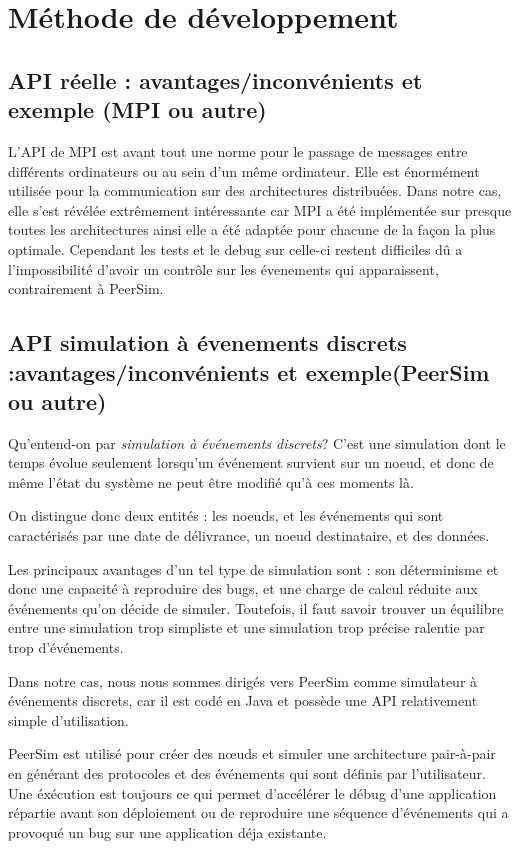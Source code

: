 \documentclass{article}
\begin{document}
		\section{Méthode de développement}
			\subsection{API réelle : avantages/inconvénients et exemple (MPI ou autre)}
			L'API de MPI est avant tout une norme pour le passage de messages entre différents ordinateurs ou au sein d'un même ordinateur.
			Elle est énormément utilisée pour la communication sur des architectures distribuées.
			Dans notre cas, elle s'est révélée extrêmement intéressante car MPI a été implémentée sur presque toutes les architectures ainsi elle 
			a été adaptée pour chacune de la façon la plus optimale. Cependant les tests et le debug sur celle-ci restent difficiles dû a l'impossibilité 
			d'avoir un contrôle sur les évenements qui apparaissent, contrairement à PeerSim.
			
			\subsection{API simulation à évenements discrets :avantages/inconvénients et exemple(PeerSim ou autre)}
				Qu'entend-on par \textit{simulation à événements discrets}? C'est une simulation dont le temps évolue seulement lorsqu'un événement survient sur un noeud, et donc de même l'état du système ne peut être modifié qu'à ces moments là.

				On distingue donc deux entités : les noeuds, et les événements qui sont caractérisés par une date de délivrance, un noeud destinataire, et des données.

				Les principaux avantages d'un tel type de simulation sont : son déterminisme et donc une capacité à reproduire des bugs, et une charge de calcul réduite aux événements qu'on décide de simuler. Toutefois, il faut savoir trouver un équilibre entre une simulation trop simpliste et une simulation trop précise ralentie par trop d'événements.

				Dans notre cas, nous nous sommes dirigés vers PeerSim comme simulateur à événements discrets, car il est codé en Java et possède une API relativement simple d'utilisation.

				PeerSim est utilisé pour créer des nœuds et simuler une architecture pair-à-pair en générant des protocoles et des événements qui sont définis par l'utilisateur. Une éxécution est toujours ce qui permet d'accélérer le débug d'une application répartie avant son déploiement ou de reproduire une séquence d'événements qui a provoqué un bug sur une application déja existante.
\end{document}
